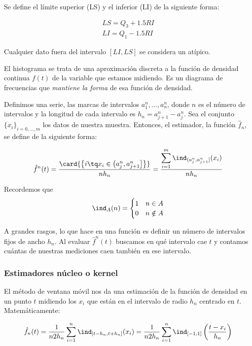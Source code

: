 \documentclass{apuntes}
\begin{document}
\begin{defn} Se define el límite superior (LS) y el inferior (LI) de la siguiente forma:

\begin{gather*}
LS = Q_3 + 1.5 RI \\
LI = Q_1 - 1.5 RI 
\end{gather*}

Cualquier dato fuera del intervalo $[LI, LS]$ se considera un atípico.
\end{defn}

\begin{defn}[Histograma]
El histograma se trata de una aproximación discreta a la función de densidad continua $f(t)$ de la variable que estamos midiendo. Es un diagrama de frecuencias que \textit{mantiene la forma} de esa función de densidad. 

Definimos una serie, las marcas de intervalos $a^n_1, \dotsc, a^n_n$, donde $n$ es el número de intervalos y la longitud de cada intervalo  es $h_n = a^n_{j+1} - a^n_j$. Sea el conjunto $\{x_i\}_{i=0,\dotsc,m}$ los datos de nuestra muestra. Entonces, el estimador, la función $\hat{f}_n$, se define de la siguiente forma:

\[ \hat{f}^n(t) = \frac{\card{\left\{i \tq x_i \in \left( a_j^n, a_{j+1}^n \right]\right\}}}{n h_n} = \frac{\displaystyle\sum_{i=1}^m \ind_{(a_j^n, a_{j+1}^n]} (x_i)}{n h_n} \]

Recordemos que \[ \ind_A (n) = \begin{cases} 1 & n \in A \\ 0 & n \notin A\end{cases}\]

A grandes rasgos, lo que hace en una función es definir un número de intervalos fijos de ancho $h_n$. Al evaluar $\hat{f}^n(t)$ buscamos en qué intervalo cae $t$ y contamos cuántas de nuestras mediciones caen también en ese intervalo.


\end{defn}

\subsubsection{Estimadores núcleo o kernel}
\label{secEst}
\begin{defn}
El método de ventana móvil nos da una estimación de la función de densidad en un punto $t$ midiendo los $x_i$ que están en el intervalo de radio $h_n$ centrado en $t$. Matemáticamente:

\[ \hat{f}_n(t) = \frac{1}{n2h_n}\sum_{i=1}^n \ind_{[t-h_n, t+h_n]}(x_i) = \frac{1}{n2h_n}\sum_{i=1}^n \ind_{[-1,1]}\left(\frac{t-x_i}{h_n}\right) \]
\end{defn}
\end{document}
